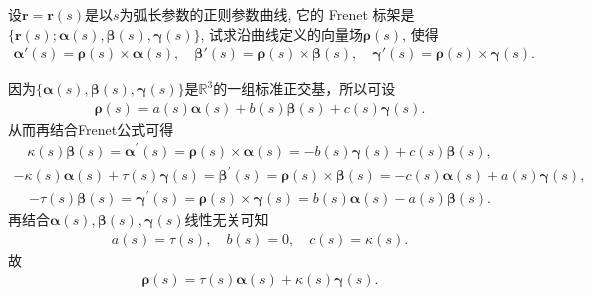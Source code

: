 \documentclass[../../main.tex]{subfiles}%
\begin{document}
\begin{example}
设$\bm{r} = \bm{r}(s)$是以$s$为弧长参数的正则参数曲线, 它的 Frenet 标架是$\{\bm{r}(s); \bm{\alpha}(s), \bm{\beta}(s), \bm{\gamma}(s)\}$, 试求沿曲线定义的向量场$\bm{\rho}(s)$, 使得
\begin{align*}
\bm{\alpha}'(s) = \bm{\rho}(s) \times \bm{\alpha}(s),\quad \bm{\beta}'(s) = \bm{\rho}(s) \times \bm{\beta}(s),\quad \bm{\gamma}'(s) = \bm{\rho}(s) \times \bm{\gamma}(s).
\end{align*}
\end{example}
\begin{solution}
因为$\{\bm{\alpha}\left(s\right),\bm{\beta}\left(s\right),\bm{\gamma}\left(s\right)\}$是$\mathbb{R}^3$的一组标准正交基，所以可设
\begin{align*}
\bm{\rho}\left(s\right)=a\left(s\right)\bm{\alpha}\left(s\right)+b\left(s\right)\bm{\beta}\left(s\right)+c\left(s\right)\bm{\gamma}\left(s\right).
\end{align*}
从而再结合Frenet公式可得
\begin{align*}
\kappa\left(s\right)\bm{\beta}\left(s\right)=\bm{\alpha}^\prime\left(s\right)=\bm{\rho}\left(s\right)\times\bm{\alpha}\left(s\right)=-b\left(s\right)\bm{\gamma}\left(s\right)+c\left(s\right)\bm{\beta}\left(s\right),
\end{align*}
\begin{align*}
-\kappa\left(s\right)\bm{\alpha}\left(s\right)+\tau\left(s\right)\bm{\gamma}\left(s\right)=\bm{\beta}^\prime\left(s\right)=\bm{\rho}\left(s\right)\times\bm{\beta}\left(s\right)=-c\left(s\right)\bm{\alpha}\left(s\right)+a\left(s\right)\bm{\gamma}\left(s\right),
\end{align*}
\begin{align*}
-\tau\left(s\right)\bm{\beta}\left(s\right)=\bm{\gamma}^\prime\left(s\right)=\bm{\rho}\left(s\right)\times\bm{\gamma}\left(s\right)=b\left(s\right)\bm{\alpha}\left(s\right)-a\left(s\right)\bm{\beta}\left(s\right).
\end{align*}
再结合$\bm{\alpha}\left(s\right),\bm{\beta}\left(s\right),\bm{\gamma}\left(s\right)$线性无关可知
\begin{align*}
a\left(s\right)=\tau\left(s\right),\quad b\left(s\right)=0,\quad c\left(s\right)=\kappa\left(s\right).
\end{align*}
故
\begin{align*}
\bm{\rho}\left(s\right)=\tau\left(s\right)\bm{\alpha}\left(s\right)+\kappa\left(s\right)\bm{\gamma}\left(s\right).
\end{align*}

\end{solution}
\end{document}
